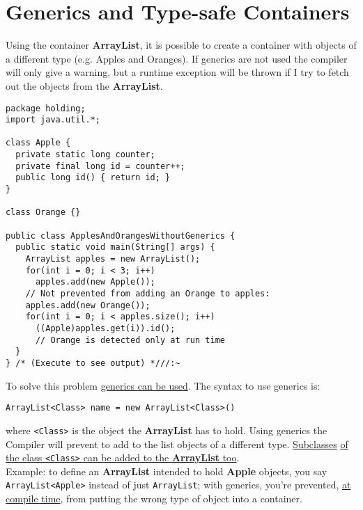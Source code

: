 \documentclass[10pt,letterpaper]{report}
\begin{document}
\section{Generics and Type-safe Containers}
Using the container \textbf{ArrayList}, it is possible to create a container with objects of a different type (e.g. Apples and Oranges). If generics are not used the compiler will only give a warning, but a runtime exception will be thrown if I try to fetch out the objects from the \textbf{ArrayList}.
\begin{lstlisting}
package holding;
import java.util.*;

class Apple {
  private static long counter;
  private final long id = counter++;
  public long id() { return id; }
}

class Orange {}	

public class ApplesAndOrangesWithoutGenerics {
  public static void main(String[] args) {
    ArrayList apples = new ArrayList();
    for(int i = 0; i < 3; i++)
      apples.add(new Apple());
    // Not prevented from adding an Orange to apples:
    apples.add(new Orange());
    for(int i = 0; i < apples.size(); i++)
      ((Apple)apples.get(i)).id();
      // Orange is detected only at run time
  }
} /* (Execute to see output) *///:~
\end{lstlisting}
To solve this problem \underline{generics can be used}. The syntax to use generics is:
\begin{lstlisting}
ArrayList<Class> name = new ArrayList<Class>()
\end{lstlisting}
where \texttt{<Class>} is the object the \textbf{ArrayList} has to hold. Using generics the Compiler will prevent to add to the list objects of a different type. \underline{Subclasses} \underline{of the class \texttt{<Class>} can be added to the \textbf{ArrayList} too}.\\

Example: to define an \textbf{ArrayList} intended to hold \textbf{Apple} objects, you say \texttt{ArrayList<Apple>} instead of just \texttt{ArrayList}; with generics, you're prevented, \underline{at compile time}, from putting the wrong type of object into a container.
\end{document}
